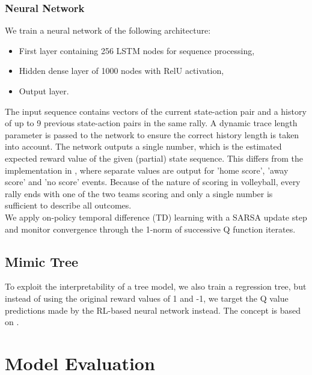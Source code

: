 \documentclass{sfuthesis}
\begin{document}
	\subsection{Neural Network}

	We train a neural network of the following architecture:
	\begin{itemize}
		\item First layer containing 256 LSTM nodes for sequence processing,
		\item Hidden dense layer of 1000 nodes with RelU activation,
		\item Output layer.
	\end{itemize}
	The input sequence contains vectors of the current state-action pair and a history of up to 9 previous state-action pairs in the same rally. A dynamic trace length parameter is passed to the network to ensure the correct history length is taken into account. The network outputs a single number, which is the estimated expected reward value of the given (partial) state sequence. This differs from the implementation in \cite{liu2018deep}, where separate values are output for 'home score', 'away score' and 'no score' events. Because of the nature of scoring in volleyball, every rally ends with one of the two teams scoring and only a single number is sufficient to describe all outcomes.\\
	We apply on-policy temporal difference (TD) learning with a SARSA update step and monitor convergence through the 1-norm of successive Q function iterates.
	
	\section{Mimic Tree}
	
	To exploit the interpretability of a tree model, we also train a regression tree, but instead of using the original reward values of 1 and -1, we target the Q value predictions made by the RL-based neural network instead. The concept is based on \cite{sun2020cracking}.
	
	\chapter{Model Evaluation}
	
\end{document}
